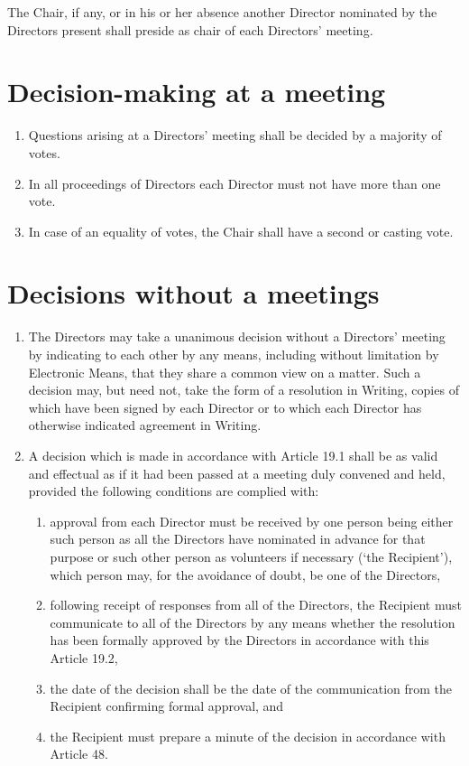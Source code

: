 \documentclass[a4paper,12pt]{article}
\begin{document}
The Chair, if any, or in his or her absence another Director nominated by the Directors present shall preside as chair of each Directors' meeting.

\section{Decision-making at a meeting}

\begin{enumerate}
  \color{red}
  \item Questions arising at a Directors' meeting shall be decided by a majority of votes. %
  \item In all proceedings of Directors each Director must not have more than one vote.\color{black} %
  \item In case of an equality of votes, the Chair shall have a second or casting vote.
\end{enumerate}

\section{Decisions without a meetings}

\begin{enumerate}
  \item The Directors may take a unanimous decision without a Directors' meeting by indicating to each other by any means, including without limitation by Electronic Means, that they share a common view on a matter. Such a decision may, but need not, take the form of a resolution in Writing, copies of which have been signed by each Director or to which each Director has otherwise indicated agreement in Writing.
  \item A decision which is made in accordance with Article 19.1 shall be as valid and effectual as if it had been passed at a meeting duly convened and held, provided the following conditions are complied with:
  \begin{enumerate}
    \item approval from each Director must be received by one person being either such person as all the Directors have nominated in advance for that purpose or such other person as volunteers if necessary (`the Recipient'), which person may, for the avoidance of doubt, be one of the Directors,
    \item following receipt of responses from all of the Directors, the Recipient must communicate to all of the Directors by any means whether the resolution has been formally approved by the Directors in accordance with this Article 19.2,
    \item the date of the decision shall be the date of the communication from the Recipient confirming formal approval, and
    \item the Recipient must prepare a minute of the decision in accordance with Article 48.
  \end{enumerate}
\end{enumerate}
\end{document}
